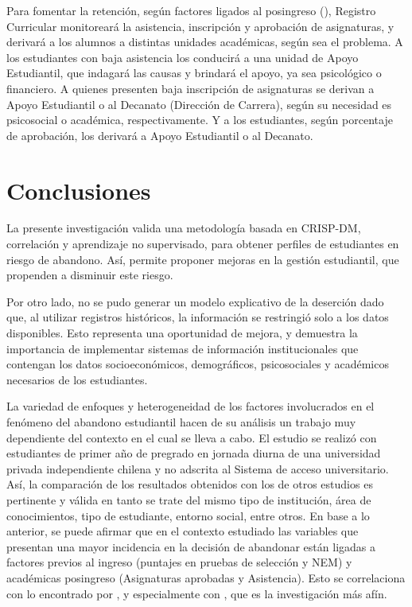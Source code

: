\documentclass[portuguese]{textolivre}
\begin{document}
Para fomentar la retención, según factores ligados al posingreso (), Registro Curricular monitoreará la asistencia, inscripción y aprobación de asignaturas, y derivará a los alumnos a distintas unidades académicas, según sea el problema. A los estudiantes con baja asistencia los conducirá a una unidad de Apoyo Estudiantil, que indagará las causas y brindará el apoyo, ya sea psicológico o financiero. A quienes presenten baja inscripción de asignaturas se derivan a Apoyo Estudiantil o al Decanato (Dirección de Carrera), según su necesidad es psicosocial o académica, respectivamente. Y a los estudiantes, según porcentaje de aprobación, los derivará a Apoyo Estudiantil o al Decanato.


\section{Conclusiones}\label{sec-organizacao}

La presente investigación valida una metodología basada en CRISP-DM, correlación y aprendizaje no supervisado, para obtener perfiles de estudiantes en riesgo de abandono. Así, permite proponer mejoras en la gestión estudiantil, que propenden a disminuir este riesgo.

Por otro lado, no se pudo generar un modelo explicativo de la deserción dado que, al utilizar registros históricos, la información se restringió solo a los datos disponibles. Esto representa una oportunidad de mejora, y demuestra la importancia de implementar sistemas de información institucionales que contengan los datos socioeconómicos, demográficos, psicosociales y académicos necesarios de los estudiantes.

La variedad de enfoques y heterogeneidad de los factores involucrados en el fenómeno del abandono estudiantil hacen de su análisis un trabajo muy dependiente del contexto en el cual se lleva a cabo. El estudio se realizó con estudiantes de primer año de pregrado en jornada diurna de una universidad privada independiente chilena y no adscrita al Sistema de acceso universitario. Así, la comparación de los resultados obtenidos con los de otros estudios es pertinente y válida en tanto se trate del mismo tipo de institución, área de conocimientos, tipo de estudiante, entorno social, entre otros. En base a lo anterior, se puede afirmar que en el contexto estudiado las variables que presentan una mayor incidencia en la decisión de abandonar están ligadas a factores previos al ingreso (puntajes en pruebas de selección y NEM) y académicas posingreso (Asignaturas aprobadas y Asistencia). Esto se correlaciona con lo encontrado por \cite{BarriosF2011,Larroucau2015,Carvajal2018,Velasquez2014}, y especialmente con \cite{Miranda2017}, que es la investigación más afín.
\end{document}
